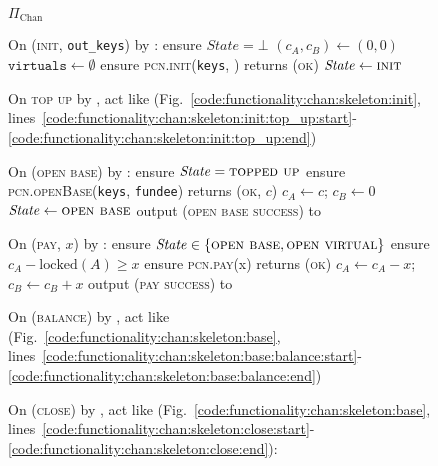 \begin{figure}[H]
  \begin{protocolbox}{$\Pi_{\mathrm{Chan}}$}
    \begin{algorithmic}[1]
      \State On (\textsc{init}, \texttt{out\_keys}) by \environment:
      \Indent
        \State ensure $\mathit{State} = \bot$
        \State $(c_A, c_B) \gets (0, 0)$
        \State $\texttt{virtuals} \gets \emptyset$
        \State ensure \textsc{pcn.init}(\texttt{keys}, \alice) returns
        (\textsc{ok})
        \State $\mathit{State} \gets \textsc{init}$
      \EndIndent
      \Statex

      \State On \textsc{top up} by \environment, act like \fchan
      (Fig.~\ref{code:functionality:chan:skeleton:init},
      lines~\ref{code:functionality:chan:skeleton:init:top_up:start}-\ref{code:functionality:chan:skeleton:init:top_up:end})
      \Statex

      \State On (\textsc{open base}) by \environment:
      \Indent
        \State ensure $\mathit{State} = \textsc{topped up}$
        \State ensure \textsc{pcn.openBase}(\texttt{keys}, \texttt{fundee})
        returns (\textsc{ok}, $c$)
        \State $c_A \gets c$; $c_B \gets 0$
        \State $\mathit{State} \gets \textsc{open base}$
        \State output (\textsc{open base success}) to \environment
      \EndIndent
      \Statex

      \State On (\textsc{pay}, $x$) by \environment:
      \Indent
        \State ensure $\mathit{State} \in \{\textsc{open base}, \textsc{open
        virtual}\}$
        \State ensure $c_A - \mathrm{locked}(A) \geq x$
        \State ensure \textsc{pcn.pay}(x) returns (\textsc{ok})
        \State $c_A \gets c_A - x$; $c_B \gets c_B + x$
        \State output (\textsc{pay success}) to \environment
      \EndIndent
      \Statex

      \State On (\textsc{balance}) by \environment, act like \fchan
      (Fig.~\ref{code:functionality:chan:skeleton:base},
      lines~\ref{code:functionality:chan:skeleton:base:balance:start}-\ref{code:functionality:chan:skeleton:base:balance:end})
      \Statex

      \State On (\textsc{close}) by \environment, act like \fchan
      (Fig.~\ref{code:functionality:chan:skeleton:base},
      lines~\ref{code:functionality:chan:skeleton:close:start}-\ref{code:functionality:chan:skeleton:close:end}):
    \end{algorithmic}
  \end{protocolbox}
  \caption{}
  \label{code:protocol:chan:skeleton}
\end{figure}

